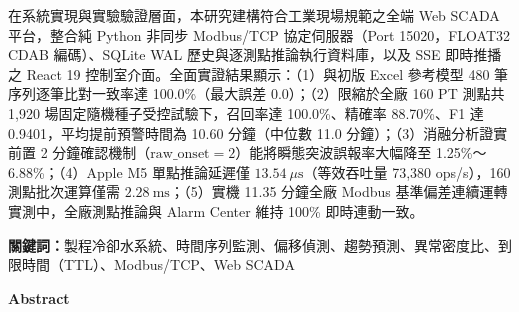 \documentclass[fontset=none, a4paper, 12pt]{ctexart}
\begin{document}
在系統實現與實驗驗證層面，本研究建構符合工業現場規範之全端 Web SCADA 平台，整合純 Python 非同步 Modbus/TCP 協定伺服器（Port 15020，FLOAT32 CDAB 編碼）、SQLite WAL 歷史與逐測點推論執行資料庫，以及 SSE 即時推播之 React 19 控制室介面。全面實證結果顯示：（1）與初版 Excel 參考模型 480 筆序列逐筆比對一致率達 100.0\%（最大誤差 0.0）；（2）限縮於全廠 160 PT 測點共 1,920 場固定隨機種子受控試驗下，召回率達 100.0\%、精確率 88.70\%、F1 達 0.9401，平均提前預警時間為 10.60 分鐘（中位數 11.0 分鐘）；（3）消融分析證實前置 2 分鐘確認機制（$\text{raw\_onset}=2$）能將瞬態突波誤報率大幅降至 1.25\%～6.88\%；（4）Apple M5 單點推論延遲僅 $13.54\ \mu\mathrm{s}$（等效吞吐量 73,380 ops/s），160 測點批次運算僅需 $2.28\ \mathrm{ms}$；（5）實機 11.35 分鐘全廠 Modbus 基準偏差連續運轉實測中，全廠測點推論與 Alarm Center 維持 100\% 即時連動一致。

\vspace{1em}
\noindent \textbf{關鍵詞：}製程冷卻水系統、時間序列監測、偏移偵測、趨勢預測、異常密度比、到限時間（TTL）、Modbus/TCP、Web SCADA

\newpage

{}
\begin{center}
\large\bfseries Abstract
\end{center}
\vspace{0.3em}
\end{document}
